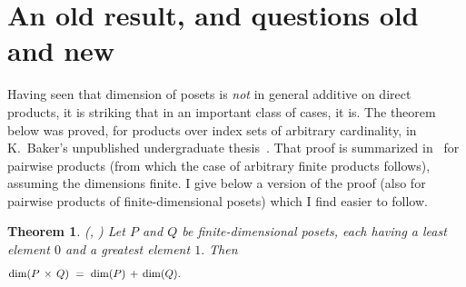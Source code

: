 \documentclass{amsart}
\newtheorem{theorem}{Theorem}
\numberwithin{equation}{section}
\numberwithin{theorem}{section}
\newcommand{\2}{\mathbf{2}}
\begin{document}
\section{An old result, and questions old and new}\label{S.questions}

Having seen that dimension of posets is {\em not} in
general additive on direct products, it is striking that in an important
class of cases, it is.
The theorem below was proved, for products over index sets of arbitrary
cardinality, in K.~Baker's unpublished undergraduate
thesis~\cite{KB}.
That proof is summarized in~\cite{K+T}
for pairwise products (from which the case of arbitrary
finite products follows), assuming the dimensions finite.
I give below a version of the proof (also for pairwise products of
finite-dimensional posets) which I find easier to follow.

\begin{theorem}\label{T.prod_bdd}
\textup{(\cite[p.9, Property~3]{KB}, \cite[p.179, last 11 lines]{K+T})}
Let $P$ and $Q$ be finite-dimensional posets, each
having a least element $0$ and a greatest element $1.$
Then
%
\begin{equation}\begin{minipage}[c]{35pc}\label{d.dim=sum}
$\dim(P\,\times\,Q)\ =\ \dim(P)\,+\,\dim(Q).$
\end{minipage}\end{equation}
%
\end{theorem}
\end{document}
